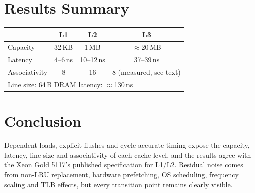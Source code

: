 \documentclass[11pt]{article}
\begin{document}
\section{Results Summary}
\begin{table}[h]
  \centering
  \begin{tabular}{lccc}
    \toprule
    & L1 & L2 & L3 \\
    \midrule
    Capacity      & 32\,KB & 1\,MB & $\approx$20\,MB \\
    Latency       & 4--6\,ns & 10--12\,ns & 37--39\,ns \\
    Associativity & 8 & 16 & 8 (measured, see text) \\
    \midrule
    \multicolumn{4}{l}{Line size: 64\,B \quad DRAM latency: $\approx$130\,ns} \\
    \bottomrule
  \end{tabular}
\end{table}

\section{Conclusion}
Dependent loads, explicit flushes and cycle-accurate timing expose the capacity,
latency, line size and associativity of each cache level, and the results agree with
the Xeon Gold 5117's published specification for L1/L2. Residual noise comes from
non-LRU replacement, hardware prefetching, OS scheduling, frequency scaling and TLB
effects, but every transition point remains clearly visible.
\end{document}
